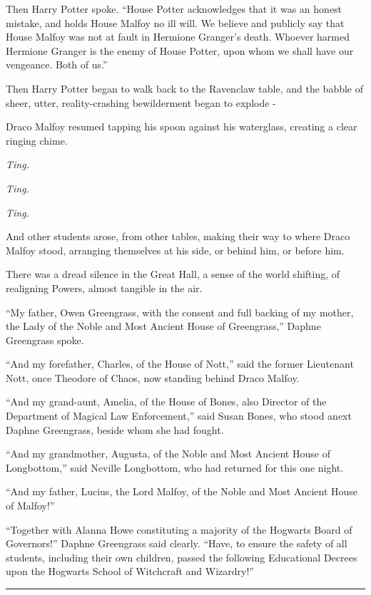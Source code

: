 Then Harry Potter spoke. ``House Potter acknowledges that it was an honest mistake, and holds House Malfoy no ill will. We believe and publicly say that House Malfoy was not at fault in Hermione Granger's death. Whoever harmed Hermione Granger is the enemy of House Potter, upon whom we shall have our vengeance. Both of us.''

Then Harry Potter began to walk back to the Ravenclaw table, and the babble of sheer, utter, reality-crashing bewilderment began to explode -

Draco Malfoy resumed tapping his spoon against his waterglass, creating a clear ringing chime.

\emph{Ting.}

\emph{Ting.}

\emph{Ting.}

And other students arose, from other tables, making their way to where Draco Malfoy stood, arranging themselves at his side, or behind him, or before him.

There was a dread silence in the Great Hall, a sense of the world shifting, of realigning Powers, almost tangible in the air.

``My father, Owen Greengrass, with the consent and full backing of my mother, the Lady of the Noble and Most Ancient House of Greengrass,'' Daphne Greengrass spoke.

``And my forefather, Charles, of the House of Nott,'' said the former Lieutenant Nott, once Theodore of Chaos, now standing behind Draco Malfoy.

``And my grand-aunt, Amelia, of the House of Bones, also Director of the Department of Magical Law Enforcement,'' said Susan Bones, who stood anext Daphne Greengrass, beside whom she had fought.

``And my grandmother, Augusta, of the Noble and Most Ancient House of Longbottom,'' said Neville Longbottom, who had returned for this one night.

``And my father, Lucius, the Lord Malfoy, of the Noble and Most Ancient House of Malfoy!''

``Together with Alanna Howe constituting a majority of the Hogwarts Board of Governors!'' Daphne Greengrass said clearly. ``Have, to ensure the safety of all students, including their own children, passed the following Educational Decrees upon the Hogwarts School of Witchcraft and Wizardry!''

\begin{center}\rule{3in}{0.4pt}\end{center}

